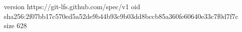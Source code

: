 version https://git-lfs.github.com/spec/v1
oid sha256:2f07bb17c570ed5a52de9b44b93c9b03dd8bccb85a360fe60640e33c7f0d7f7c
size 628
